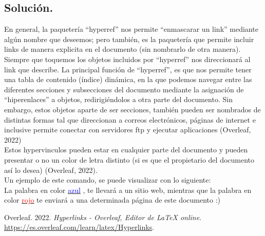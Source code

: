 \documentclass[letterpaper,12pt]{article}
\begin{document}
    \subsection*{Solución.}
    En general, la paquetería ``hyperref'' nos permite ``enmascarar un link'' mediante algún nombre que deseemos; pero también, es la paquetería que permite incluir links de manera explicita en el documento (sin nombrarlo de otra manera). Siempre que toquemos los objetos incluidos por ``hyperref'' nos direccionará al link que describe.
    La principal función de ``hyperref'', es que nos permite tener una tabla de contenido (índice) dinámica, en la que podemos navegar entre las diferentes secciones y subsecciones del documento mediante la asignación de ``hiperenlaces'' a objetos, redirigiéndolos a otra parte del documento. Sin embargo, estos objetos aparte de ser secciones, también pueden ser nombrados de distintas formas tal que direccionan a correos electrónicos, páginas de internet e inclusive permite conectar con servidores ftp y ejecutar aplicaciones (Overleaf, 2022)\\
    Estos hypervinculos pueden estar en cualquier parte del documento y pueden presentar o no un color de letra distinto (si es que el propietario del documento así lo desea) (Overleaf, 2022).\\

    Un ejemplo de este comando, se puede visualizar con lo siguiente:\\
    La palabra en color \href{https://www.youtube.com/watch?v=o_1aF54DO60}{\textcolor{blue}{azul}} , te llevará a un sitio web, mientras que la palabra en color \hyperlink{uwu}{\textcolor{red}{rojo}}  te enviará a una determinada página de este documento :)
    
\begin{thebibliography}{}
\bibitem{} Overleaf. 2022. \textit{Hyperlinks - Overleaf, Editor de LaTeX online}. \url{https://es.overleaf.com/learn/latex/Hyperlinks}.
\end{thebibliography}


   
\end{document}

